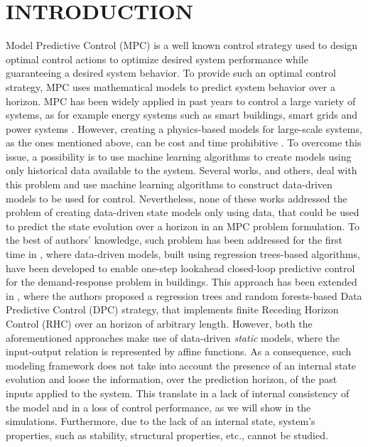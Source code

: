 \documentclass[]{ifacconf}  %
\begin{document}
\section{INTRODUCTION}\label{secIntro}
Model Predictive Control (MPC) is a well known control strategy used to design optimal control actions to optimize desired system performance while guaranteeing a desired system behavior.
To provide such an optimal control strategy, MPC uses mathematical models to predict system behavior over a horizon.
MPC has been widely applied in past years to control a large variety of systems, as for example energy systems such as smart buildings, smart grids and power systems \cite{MaTCST2015,OldewurtelEB2012,MaasoumyEB2014,IovineIFAC2017,WrightTCST2008,LiuTII2013}.
However, creating a physics-based models for large-scale systems, as the ones mentioned above, can be cost and time prohibitive \cite{SturzeneggerTCST2016,ZacekovaAE2014}.
To overcome this issue, a possibility is to use machine learning algorithms to create models using only historical data available to the system.
Several works, \cite{Macarulla2017,Afram2017,Ferreira2012} and others, deal with this problem and use machine learning algorithms to construct data-driven models to be used for control.
Nevertheless, none of these works addressed the problem of creating data-driven state models only using data, that could be used to predict the state evolution over a horizon in an MPC problem formulation.
To the best of authors' knowledge, such problem has been addressed for the first time in \cite{BehlAE2016}, where data-driven models, built using regression trees-based algorithms, have been developed to enable one-step lookahead closed-loop predictive control for the demand-response problem in buildings.
This approach has been extended in \cite{JainCDC2017}, where the authors proposed a regression trees and random forests-based Data Predictive Control (DPC) strategy, that implements finite Receding Horizon Control (RHC) over an horizon of arbitrary length.
However, both the aforementioned approaches make use of data-driven \emph{static} models, where the input-output relation is represented by affine functions.
As a consequence, such modeling framework does not take into account the presence of an internal state evolution and loose the information, over the prediction horizon, of the past inputs applied to the system. 
This translate in a lack of internal consistency of the model and in a loss of control performance, as we will show in the simulations. 
Furthermore, due to the lack of an internal state, system's properties, such as stability, structural properties, etc., cannot be studied.
\end{document}
